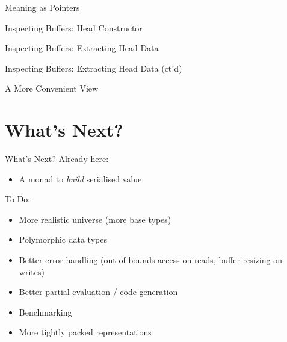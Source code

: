 \documentclass{beamer}
\begin{document}
\begin{frame}{Meaning as Pointers}
  \hspace*{-2em}

  \hspace*{-2em}
\end{frame}

\begin{frame}{Inspecting Buffers: Head Constructor}
  \hspace*{-2em}
  \hspace*{-2em}
\end{frame}

\begin{frame}{Inspecting Buffers: Extracting Head Data}
  \hspace*{-2em}
\end{frame}
\begin{frame}{Inspecting Buffers: Extracting Head Data (ct'd)}
  \hspace*{-2em}
\end{frame}

\begin{frame}{A More Convenient View}
  \hspace*{-3em}
  \hspace*{-3em}
\end{frame}

\section{What's Next?}

\begin{frame}{What's Next?}
Already here:
\begin{itemize}
  \item A monad to \emph{build} serialised value
\end{itemize}
\bigskip
To Do:
\begin{itemize}
  \item More realistic universe (more base types)
  \item Polymorphic data types
  \item Better error handling (out of bounds access on reads, buffer resizing on writes)
  \item Better partial evaluation / code generation
  \item Benchmarking
  \item More tightly packed representations
\end{itemize}
\end{frame}
\end{document}

